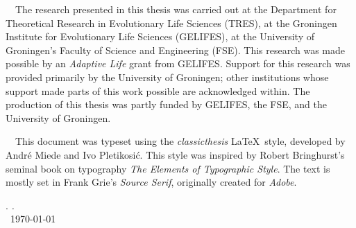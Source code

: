 \thispagestyle{empty}

\hfill

\vfill


\noindent \adftripleflourishright~~The research presented in this thesis was carried out at the Department for Theoretical Research in Evolutionary Life Sciences (TRES), at the Groningen Institute for Evolutionary Life Sciences (GELIFES), at the University of Groningen's Faculty of Science and Engineering (FSE).
This research was made possible by an \emph{Adaptive Life} grant from GELIFES.
Support for this research was provided primarily by the University of Groningen; other institutions whose support made parts of this work possible are acknowledged within.
The production of this thesis was partly funded by GELIFES, the FSE, and the University of Groningen.

\medskip

\noindent \adftripleflourishright~~This document was typeset using the \emph{classicthesis} \LaTeX~style, developed by Andr\'e Miede and Ivo Pletikosić.
This style was inspired by Robert Bringhurst's seminal book on typography \emph{The Elements of Typographic Style}.
The text is mostly set in Frank Grie\sshammer's \emph{Source Serif}, originally created for \textit{Adobe}.

\bigskip

\noindent\finalVersionString

\noindent\myName. \textit{\myTitle.}%
\\
\noindent \textcopyright\ \today

